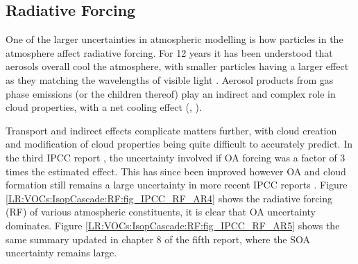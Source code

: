   \subsection{Radiative Forcing}
    \label{LR:VOCs:IsopCascade:RF}
    
    One of the larger uncertainties in atmospheric modelling is how particles in the atmosphere affect radiative forcing.
    For 12 years it has been understood that aerosols overall cool the atmosphere, with smaller particles having a larger effect as they matching the wavelengths of visible light \parencite{Kanakidou2005}.
    Aerosol products from gas phase emissions (or the children thereof) play an indirect and complex role in cloud properties, with a net cooling effect (\textcite{Kanakidou2005}, \textcite[Chapter 7,8]{IPCC_AR5_WG1}).
    
    Transport and indirect effects complicate matters further, with cloud creation and modification of cloud properties being quite difficult to accurately predict.
    In the third IPCC report \parencite{IPCC2001}, the uncertainty involved if OA forcing was a factor of 3 times the estimated effect. 
    This has since been improved however OA and cloud formation still remains a large uncertainty in more recent IPCC reports \parencite{IPCC_Chapter2}.
    Figure \ref{LR:VOCs:IsopCascade:RF:fig_IPCC_RF_AR4} shows the radiative forcing (RF) of various atmospheric constituents, it is clear that OA uncertainty dominates.
    Figure \ref{LR:VOCs:IsopCascade:RF:fig_IPCC_RF_AR5} shows the same summary updated in chapter 8 of the fifth report, where the SOA uncertainty remains large.
    
